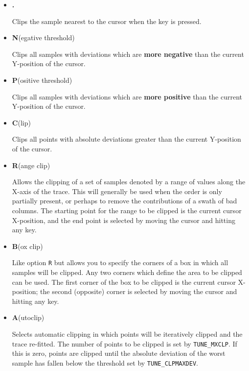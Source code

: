 \documentclass[11pt,twoside]{article}
\newcommand{\xlabel}[1]{}
\newcommand{\mlabel}[1]{\xlabel{#1}\label{#1}}
\newcommand{\sunspec}[2]{#1}
\renewcommand{\sunspec}[2]{#2}
\begin{document}
\mlabel{clip_menu}
\begin{itemize}

\item {\sunspec{\Large\tt}{\bf} .}

     Clips the sample nearest to the cursor when the key is pressed.

\item {\sunspec{\Large\tt}{\bf} N}(egative threshold)

     Clips all samples with deviations which are
     {\bf more negative} than the current Y-position of the cursor.

\item {\sunspec{\Large\tt}{\bf} P}(ositive threshold)

     Clips all samples with deviations which are
     {\bf more positive} than the current Y-position of the cursor.


\item {\sunspec{\Large\tt}{\bf} C}(lip)

     Clips all points with absolute deviations greater than the current
     Y-position of the cursor.

\item {\sunspec{\Large\tt}{\bf} R}(ange clip)

     Allows the clipping of a set of samples denoted by a range
     of values along the X-axis of the trace. This will generally be used
     when the order is only partially present, or perhaps to remove
     the contributions of a swath of bad columns. The starting point for
     the range to be clipped is the current cursor X-position, and the
     end point is selected by moving the cursor and hitting any key.

\item {\sunspec{\Large\tt}{\bf} B}(ox clip)

     Like option \texttt{R} but allows you to specify the corners of
     a box in which all samples will be clipped.  Any two corners
     which define the area to be clipped can be used.
     The first corner of the box to be clipped is the current
     cursor X-position; the second (opposite) corner
     is selected by moving the cursor and hitting any key.

\item {\sunspec{\Large\tt}{\bf} A}(utoclip)

     Selects automatic clipping in which points will be
     iteratively clipped and the trace re-fitted. The number of points
     to be clipped is set by {\tt TUNE\_MXCLP}.  If this is zero,
     points are clipped until the absolute deviation of the worst
     sample has fallen below the threshold set by {\tt TUNE\_CLPMAXDEV}.



\end{itemize}
\end{document}
